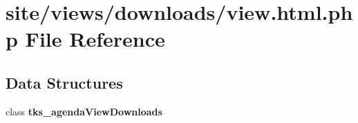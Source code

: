 \section{site/views/downloads/view.html.\+php File Reference}
\label{site_2views_2downloads_2view_8html_8php}
\subsection*{Data Structures}
\begin{DoxyCompactItemize}
\item 
class \textbf{ tks\+\_\+agenda\+View\+Downloads}
\end{DoxyCompactItemize}
